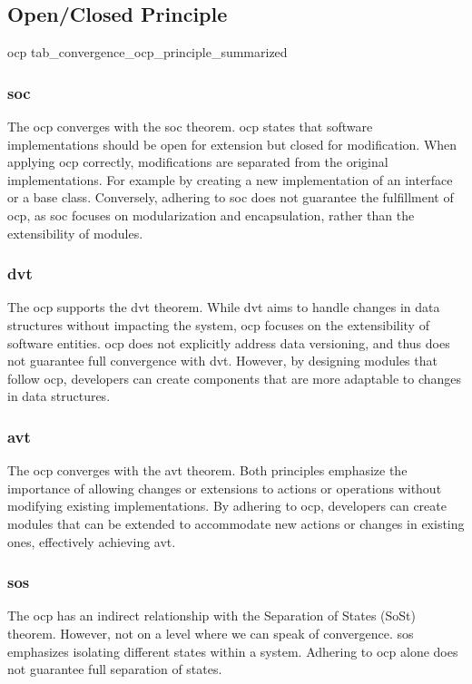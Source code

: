 \subsection{Open/Closed Principle}

\compareTable
{\acrlong*{ocp}}
{tab_convergence_ocp_principle_summarized}
{\addEvalRow{\conv & \partconv & \conv & \noconv}}

\subsubsection{\acrlong*{soc}}

The \gls{ocp} converges with the \gls{soc} theorem. \gls{ocp} states that software
implementations should be open for extension but closed for modification. When applying
\gls{ocp} correctly, modifications are separated from the original implementations. For
example by creating a new implementation of an interface or a base class. Conversely,
adhering to \gls{soc} does not guarantee the fulfillment of \gls{ocp}, as \gls{soc}
focuses on modularization and encapsulation, rather than the extensibility of modules.

\subsubsection{\acrlong*{dvt}}

The \gls{ocp} supports the \gls{dvt} theorem. While \gls{dvt} aims to handle changes in
data structures without impacting the system, \gls{ocp} focuses on the extensibility of
software entities. \gls{ocp} does not explicitly address data versioning, and thus does
not guarantee full convergence with \gls{dvt}. However, by designing modules that follow
\gls{ocp}, developers can create components that are more adaptable to changes in data
structures.

\subsubsection{\acrlong*{avt}}

The \gls{ocp} converges with the \gls{avt} theorem. Both principles emphasize the
importance of allowing changes or extensions to actions or operations without modifying
existing implementations. By adhering to \gls{ocp}, developers can create modules that can
be extended to accommodate new actions or changes in existing ones, effectively achieving
\gls{avt}.

\subsubsection{\acrlong*{sos}}

The \gls{ocp} has an indirect relationship with the Separation of States (SoSt) theorem.
However, not on a level where we can speak of convergence. \gls{sos} emphasizes isolating
different states within a system. Adhering to \gls{ocp} alone does not guarantee full
separation of states.
